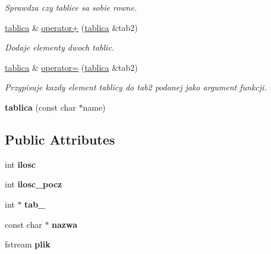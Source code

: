 \begin{DoxyCompactItemize}
\begin{DoxyCompactList}\small\item\em \-Sprawdza czy tablice sa sobie rowne. \end{DoxyCompactList}\item 
\hyperlink{classtablica}{tablica} \& \hyperlink{classtablica_abc23806d17b878996403eccdfda6f1ae}{operator+} (\hyperlink{classtablica}{tablica} \&tab2)
\begin{DoxyCompactList}\small\item\em \-Dodaje elementy dwoch tablic. \end{DoxyCompactList}\item 
\hyperlink{classtablica}{tablica} \& \hyperlink{classtablica_af37b5cf937e176c153c85c7f1958ef1d}{operator=} (\hyperlink{classtablica}{tablica} \&tab2)
\begin{DoxyCompactList}\small\item\em \-Przypisuje kazdy element tablicy do tab2 podanej jako argument funkcji. \end{DoxyCompactList}\item 
\hypertarget{classtablica_a399dff7d81480b6b0d1694bda2e66de8}{{\bfseries tablica} (const char $\ast$name)}\label{classtablica_a399dff7d81480b6b0d1694bda2e66de8}

\end{DoxyCompactItemize}
\subsection*{\-Public \-Attributes}
\begin{DoxyCompactItemize}
\item 
\hypertarget{classtablica_af78b1ba93fce972d87e7ce98ae93c8cc}{int {\bfseries ilosc}}\label{classtablica_af78b1ba93fce972d87e7ce98ae93c8cc}

\item 
\hypertarget{classtablica_a3073633c65ed1e1972d93f8634181b13}{int {\bfseries ilosc\-\_\-pocz}}\label{classtablica_a3073633c65ed1e1972d93f8634181b13}

\item 
\hypertarget{classtablica_a6733b3a13cea82d3e650af56c23ac976}{int $\ast$ {\bfseries tab\-\_}}\label{classtablica_a6733b3a13cea82d3e650af56c23ac976}

\item 
\hypertarget{classtablica_a8a732fa361987ccec1dfcf35f21087dd}{const char $\ast$ {\bfseries nazwa}}\label{classtablica_a8a732fa361987ccec1dfcf35f21087dd}

\item 
\hypertarget{classtablica_adc72ca2e658dc620ee1d9a88de2349f4}{fstream {\bfseries plik}}\label{classtablica_adc72ca2e658dc620ee1d9a88de2349f4}

\end{DoxyCompactItemize}


